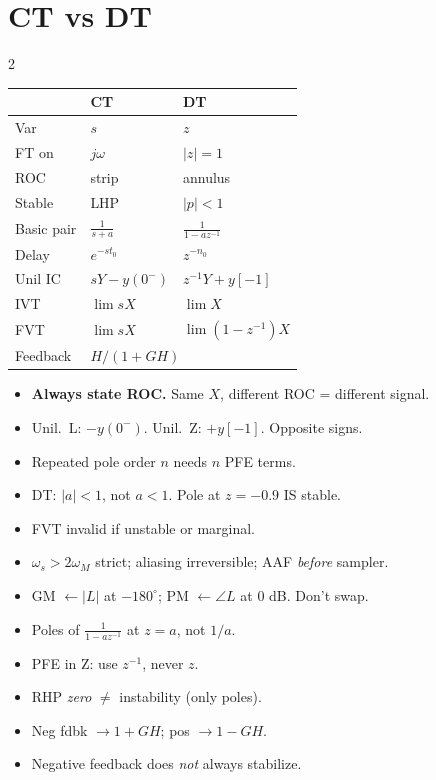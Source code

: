 \documentclass[11pt]{extarticle}
\newcommand{\pairsection}[4]{%
  \needspace{2.8in}%
  \columnratio{#1}%
  \section*{#2}%
  \begin{paracol}{2}%
  #3%
  \switchcolumn%
  #4%
  \end{paracol}%
  \par\vspace{4pt}}
\begin{document}
\pairsection{0.28}{CT vs DT}{%
\begin{tabular}{@{}l l l@{}}
\toprule
 & CT & DT \\
\midrule
Var & $s$ & $z$ \\
FT on & $j\omega$ & $|z|{=}1$ \\
ROC & strip & annulus \\
Stable & LHP & $|p|{<}1$ \\
Basic pair & $\tfrac{1}{s+a}$ & $\tfrac{1}{1-az^{-1}}$ \\
Delay & $e^{-st_0}$ & $z^{-n_0}$ \\
Unil IC & $sY{-}y(0^-)$ & $z^{-1}Y{+}y[-1]$ \\
IVT & $\lim sX$ & $\lim X$ \\
FVT & $\lim sX$ & $\lim(1{-}z^{-1})X$ \\
Feedback & \multicolumn{2}{l}{$H/(1{+}GH)$} \\
\bottomrule
\end{tabular}%
}{%
\begin{itemize}
\item \textbf{Always state ROC.} Same $X$, different ROC = different signal.
\item Unil.\ L: $\mathbf{-}y(0^-)$. Unil.\ Z: $\mathbf{+}y[-1]$. Opposite signs.
\item Repeated pole order $n$ needs $n$ PFE terms.
\item DT: $|a|<1$, not $a<1$. Pole at $z=-0.9$ IS stable.
\item FVT invalid if unstable or marginal.
\item $\omega_s>2\omega_M$ strict; aliasing irreversible; AAF \emph{before} sampler.
\item GM $\leftarrow |L|$ at $-180^\circ$; PM $\leftarrow \angle L$ at 0 dB. Don't swap.
\item Poles of $\tfrac{1}{1-az^{-1}}$ at $z=a$, not $1/a$.
\item PFE in Z: use $z^{-1}$, never $z$.
\item RHP \emph{zero} $\ne$ instability (only poles).
\item Neg fdbk $\to 1+GH$; pos $\to 1-GH$.
\item Negative feedback does \emph{not} always stabilize.
\end{itemize}%
}
\end{document}

